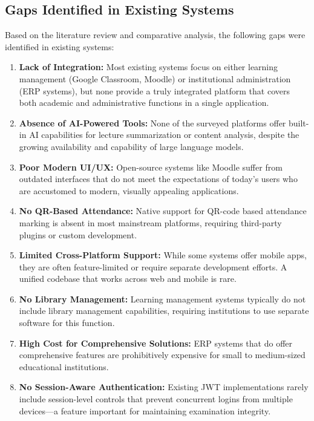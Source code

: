\subsection{Gaps Identified in Existing Systems}

Based on the literature review and comparative analysis, the following gaps were identified in existing systems:

\begin{enumerate}[label=\arabic*., leftmargin=2em]
    \item \textbf{Lack of Integration:} Most existing systems focus on either learning management (Google Classroom, Moodle) or institutional administration (ERP systems), but none provide a truly integrated platform that covers both academic and administrative functions in a single application.
    
    \item \textbf{Absence of AI-Powered Tools:} None of the surveyed platforms offer built-in AI capabilities for lecture summarization or content analysis, despite the growing availability and capability of large language models.
    
    \item \textbf{Poor Modern UI/UX:} Open-source systems like Moodle suffer from outdated interfaces that do not meet the expectations of today's users who are accustomed to modern, visually appealing applications.
    
    \item \textbf{No QR-Based Attendance:} Native support for QR-code based attendance marking is absent in most mainstream platforms, requiring third-party plugins or custom development.
    
    \item \textbf{Limited Cross-Platform Support:} While some systems offer mobile apps, they are often feature-limited or require separate development efforts. A unified codebase that works across web and mobile is rare.
    
    \item \textbf{No Library Management:} Learning management systems typically do not include library management capabilities, requiring institutions to use separate software for this function.
    
    \item \textbf{High Cost for Comprehensive Solutions:} ERP systems that do offer comprehensive features are prohibitively expensive for small to medium-sized educational institutions.
    
    \item \textbf{No Session-Aware Authentication:} Existing JWT implementations rarely include session-level controls that prevent concurrent logins from multiple devices---a feature important for maintaining examination integrity.
\end{enumerate}

